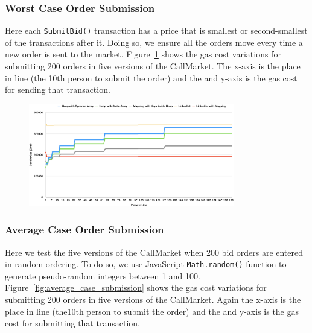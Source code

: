 
\subsubsection{Worst Case Order Submission}

Here each \texttt{SubmitBid()} transaction has a price that is smallest or second-smallest of the transactions after it. Doing so, we ensure all the orders move every time a new order is sent to the market. Figure~\ref{fig:worst_case_submission} shows the gas cost variations for submitting 200 orders in five versions of the CallMarket. The x-axis is the place in line (\eg the 10th person to submit the order) and the and y-axis is the gas cost for sending that transaction.



\begin{figure}[htb!p]
\centering
\includegraphics[width=0.8\textwidth]{fig/worst_case_submission_3.png}
\caption{\footnotesize{}  \label{fig:worst_case_submission}}
\end{figure}




\subsubsection{Average Case Order Submission}

Here we test the five versions of the CallMarket when 200 bid orders are entered in random ordering. To do so, we use JavaScript \texttt{Math.random()} function to generate pseudo-random integers between 1 and 100. Figure~\ref{fig:average_case_submission} shows the gas cost variations for submitting 200 orders in five versions of the CallMarket. Again the x-axis is the place in line (\eg the10th person to submit the order) and the and y-axis is the gas cost for submitting that transaction. 

